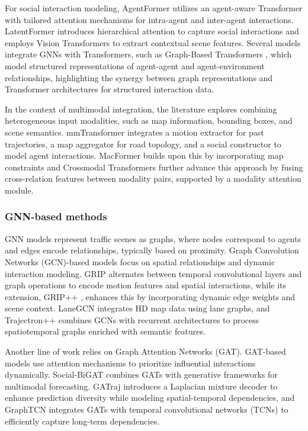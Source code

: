 For social interaction modeling, AgentFormer \cite{9710708} utilizes an agent-aware Transformer with tailored attention mechanisms for intra-agent and inter-agent interactions. LatentFormer \cite{Amirloo2022LatentFormerMT} introduces hierarchical attention to capture social interactions and employs Vision Transformers to extract contextual scene features. Several models integrate GNNs with Transformers, such as Graph-Based Transformers \cite{Li2022GraphbasedST, zhang_2022, 10504962}, which model structured representations of agent-agent and agent-environment relationships, highlighting the synergy between graph representations and Transformer architectures for structured interaction data.

In the context of multimodal integration, the literature explores combining heterogeneous input modalities, such as map information, bounding boxes, and scene semantics. mmTransformer \cite{9577819} integrates a motion extractor for past trajectories, a map aggregator for road topology, and a social constructor to model agent interactions. MacFormer \cite{Feng_2023} builds upon this by incorporating map constraints and Crossmodal Transformers \cite{9812226} further advance this approach by fusing cross-relation features between modality pairs, supported by a modality attention module.

\subsubsection{GNN-based methods}
GNN models represent traffic scenes as graphs, where nodes correspond to agents and edges encode relationships, typically based on proximity. Graph Convolution Networks (GCN)-based models focus on spatial relationships and dynamic interaction modeling. GRIP \cite{8917228} alternates between temporal convolutional layers and graph operations to encode motion features and spatial interactions, while its extension, GRIP++ \cite{Li2019GRIPEG}, enhances this by incorporating dynamic edge weights and scene context. LaneGCN \cite{liang2020learning} integrates HD map data using lane graphs, and Trajectron++ \cite{10.1007/978-3-030-58523-5_40} combines GCNs with recurrent architectures to process spatiotemporal graphs enriched with semantic features.

Another line of work relies on Graph Attention Networks (GAT). GAT-based models use attention mechanisms to prioritize influential interactions dynamically. Social-BiGAT \cite{e294141389194a54a05536938fcdd509} combines GATs with generative frameworks for multimodal forecasting. GATraj \cite{CHENG2023163} introduces a Laplacian mixture decoder to enhance prediction diversity while modeling spatial-temporal dependencies, and GraphTCN \cite{Wang2020GraphTCNSI} integrates GATs with temporal convolutional networks (TCNs) to efficiently capture long-term dependencies.

